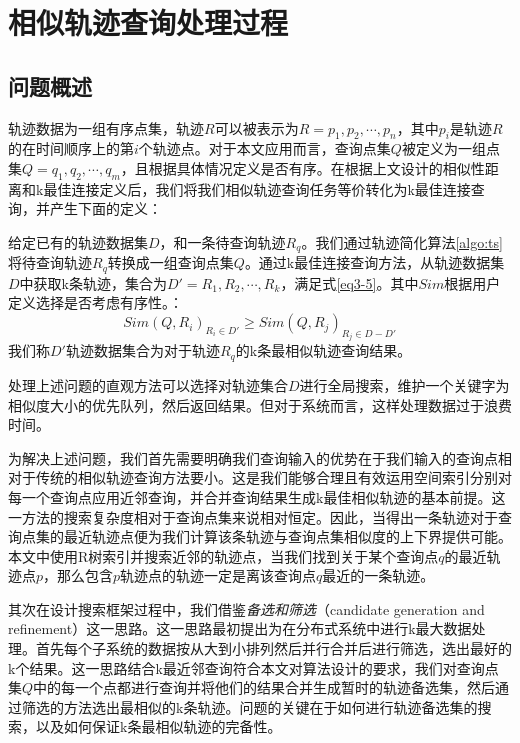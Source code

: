 \section{相似轨迹查询处理过程}
\label{sec:query processing}

\subsection{问题概述}
\label{sec:problem Forumation}
轨迹数据为一组有序点集，轨迹$R$可以被表示为$R={p_{1}, p_{2}, \cdots, p_{n}}$，其中$p_{i}$是轨迹$R$的在时间顺序上的第$i$个轨迹点。对于本文应用而言，查询点集$Q$被定义为一组点集$Q={q_{1}, q_{2}, \cdots, q_{m}}$，且根据具体情况定义是否有序。在根据上文设计的相似性距离和k最佳连接定义后，我们将我们相似轨迹查询任务等价转化为k最佳连接查询，并产生下面的定义：

\theoremstyle{definition}
\begin{definition}
	给定已有的轨迹数据集$D$，和一条待查询轨迹$R_{q}$。我们通过轨迹简化算法\ref{algo:ts}将待查询轨迹$R_{q}$转换成一组查询点集$Q$。通过k最佳连接查询方法，从轨迹数据集$D$中获取k条轨迹，集合为$D' = {R_{1}, R_{2}, \cdots, R_{k}}$，满足式\ref{eq3-5}。其中$Sim$根据用户定义选择是否考虑有序性。：
	\begin{equation}
		\label{eq3-5}
		Sim(Q,R_{i})_{R_{i} \in D'} \geq Sim(Q,R_{j})_{R_{j} \in D-D'}
	\end{equation}
	我们称$D'$轨迹数据集合为对于轨迹$R_{q}$的k条最相似轨迹查询结果。
\end{definition}

处理上述问题的直观方法可以选择对轨迹集合$D$进行全局搜索，维护一个关键字为相似度大小的优先队列，然后返回结果。但对于系统而言，这样处理数据过于浪费时间。

为解决上述问题，我们首先需要明确我们查询输入的优势在于我们输入的查询点相对于传统的相似轨迹查询方法要小。这是我们能够合理且有效运用空间索引分别对每一个查询点应用近邻查询，并合并查询结果生成k最佳相似轨迹的基本前提。这一方法的搜索复杂度相对于查询点集来说相对恒定。因此，当得出一条轨迹对于查询点集的最近轨迹点便为我们计算该条轨迹与查询点集相似度的上下界提供可能。本文中使用R树索引并搜索近邻的轨迹点，当我们找到关于某个查询点$q$的最近轨迹点$p$，那么包含$p$轨迹点的轨迹一定是离该查询点$q$最近的一条轨迹。

其次在设计搜索框架过程中，我们借鉴\emph{备选和筛选}（candidate generation and refinement）这一思路。这一思路最初提出为在分布式系统中进行k最大数据处理。首先每个子系统的数据按从大到小排列然后并行合并后进行筛选，选出最好的k个结果。这一思路结合k最近邻查询符合本文对算法设计的要求，我们对查询点集$Q$中的每一个点都进行查询并将他们的结果合并生成暂时的轨迹备选集，然后通过筛选的方法选出最相似的k条轨迹。问题的关键在于如何进行轨迹备选集的搜索，以及如何保证k条最相似轨迹的完备性。

